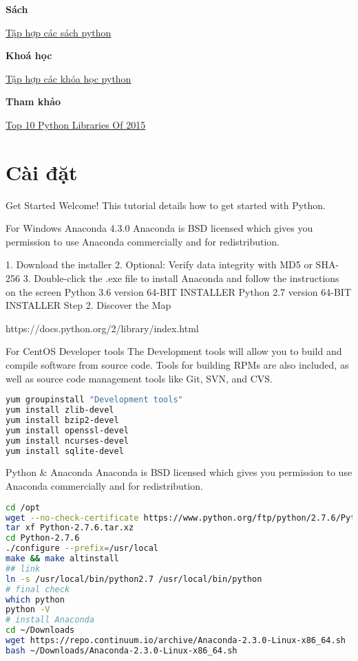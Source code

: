 \textbf{Sách}

\href{https://docs.google.com/document/d/1gQFMXZtynpuTenoOQNGCHttArT4NspTWcyJQr5ps9Mk/edit?usp=sharing}{Tập hợp các sách python}

\textbf{Khoá học}

\href{1frO9QYhgsXbMzcyXoA4czWkxTWF8RBTJVf9uoO1rElU}{Tập hợp các khóa học python}

\textbf{Tham khảo}

\href{http://blog.tryolabs.com/2015/12/15/top-10-python-libraries-of-2015/}{Top 10 Python Libraries Of 2015}

\section{Cài đặt}

Get Started
Welcome! This tutorial details how to get started with Python.

For Windows
Anaconda 4.3.0
Anaconda is BSD licensed which gives you permission to use Anaconda commercially and for redistribution.

1. Download the installer
2. Optional: Verify data integrity with MD5 or SHA-256
3. Double-click the .exe file to install Anaconda and follow the instructions on the screen
Python 3.6 version
64-BIT INSTALLER
Python 2.7 version
64-BIT INSTALLER
Step 2. Discover the Map

https://docs.python.org/2/library/index.html

For CentOS
Developer tools
The Development tools will allow you to build and compile software from source code. Tools for building RPMs are also included, as well as source code management tools like Git, SVN, and CVS.

\begin{lstlisting}[language=bash]
yum groupinstall "Development tools"
yum install zlib-devel
yum install bzip2-devel
yum install openssl-devel
yum install ncurses-devel
yum install sqlite-devel
\end{lstlisting}

Python & Anaconda
Anaconda is BSD licensed which gives you permission to use Anaconda commercially and for redistribution.

\begin{lstlisting}[language=bash]
cd /opt
wget --no-check-certificate https://www.python.org/ftp/python/2.7.6/Python-2.7.6.tar.xz
tar xf Python-2.7.6.tar.xz
cd Python-2.7.6
./configure --prefix=/usr/local
make && make altinstall
## link
ln -s /usr/local/bin/python2.7 /usr/local/bin/python
# final check
which python
python -V
# install Anaconda
cd ~/Downloads
wget https://repo.continuum.io/archive/Anaconda-2.3.0-Linux-x86_64.sh
bash ~/Downloads/Anaconda-2.3.0-Linux-x86_64.sh
\end{lstlisting}

